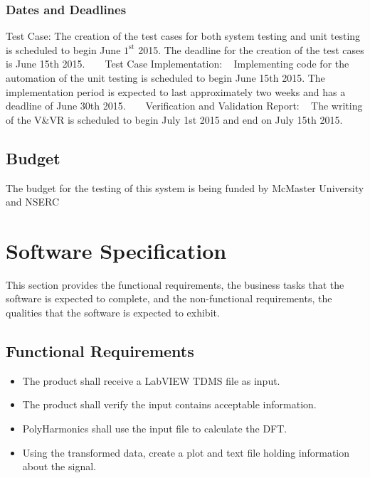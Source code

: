 \documentclass[12pt]{article}
\newcommand{\progname}{PolyHarmonics}
\begin{document}
\subsubsection{Dates and Deadlines}
Test Case:\newline
The creation of the test cases for both system testing and unit testing is scheduled to begin June $1^\text{st}$ 2015. %
The deadline for the creation of the test cases is June 15th 2015.  %
~\newline
~\newline
Test Case Implementation:
~\newline
Implementing code for the automation of the unit testing is scheduled to begin June 15th 2015. The implementation period %
is expected to last approximately two weeks and has a deadline of June 30th 2015.
~\newline
~\newline
Verification and Validation Report:
~\newline
The writing of the V\&VR is scheduled to begin July 1st 2015 and end on July 15th 2015.  %

\subsection{Budget}
The budget for the testing of this system is being funded by McMaster University and NSERC

%
%

\section{ Software Specification}
This section provides the functional requirements, the business tasks that the
software is expected to complete, and the non-functional requirements, the
qualities that the software is expected to exhibit.

\subsection{Functional Requirements}

\noindent \begin{itemize}
\item The product shall receive a LabVIEW TDMS file as input.
\item The product shall verify the input contains acceptable information.
\item \progname{} shall use the input file to calculate the DFT. 
\item Using the transformed data, create a plot and text file holding information about the signal.

\end{itemize}
\end{document}
